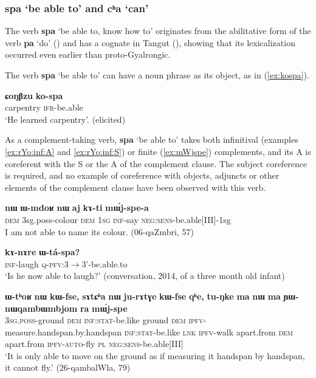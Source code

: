 \documentclass[oneside,a4paper,11pt]{article}
\newcommand{\ipa}[1]{\textbf{\phon#1}} %
\newcommand{\jpg}[2]{\ipa{#1} `#2'} %
\newcommand{\refb}[1]{(\ref{#1})}
\begin{document}
\subsubsection{\jpg{spa}{be able to} and \jpg{cʰa}{can}} \label{sec:spa}
The verb \jpg{spa}{be able to, know how to} originates from the abilitative form of the verb \ipa{pa} `do' (\citealt{jacques15causative}) and has a cognate in Tangut  (\citealt{jacques14esquisse}), showing that its lexicalization occurred even earlier than proto-Gyalrongic.

The verb \jpg{spa}{be able to} can have a noun phrase as its object, as  in \refb{ex:kospa}.

\begin{exe}
\ex \label{ex:kospa}
\gll \ipa{ɕoŋβzu}	\ipa{ko-spa} \\
carpentry \textsc{ifr}-be.able \\
\glt `He learned carpentry'. (elicited)
\end{exe}

As a complement-taking verb, \jpg{spa}{be able to} takes both infinitival (examples \ref{ex:rYo:inf:A} and \ref{ex:rYo:inf:S}) or finite (\ref{ex:mWjspe}) complements, and its A is coreferent with the S or the A of the complement clause. The subject coreference is required, and no example of coreference with objects, adjuncts or other elements of the complement clause have been observed with this verb.

\begin{exe}
\ex  \label{ex:rYo:inf:A}
\gll
\ipa{nɯ} 	\ipa{ɯ-mdoʁ} 	\ipa{nɯ} 	\ipa{aj} 	\ipa{kɤ-ti} 	\ipa{mɯ́j-spe-a} \\
\textsc{dem} 3sg.poss-colour \textsc{dem} \textsc{1sg} \textsc{inf}-say \textsc{neg:sens}-be.able[III]-1sg \\
\glt I am not able to name its colour. (06-qaZmbri, 57)
\end{exe}

\begin{exe}
\ex  \label{ex:rYo:inf:S}
\gll 
 \ipa{kɤ-nɤre} 	\ipa{ɯ-tá-spa?}\\
 \textsc{inf}-laugh \textsc{q-pfv}:3$\rightarrow$3'-be.able.to\\
 \glt `Is he now able to laugh?' (conversation, 2014, of a three month old infant)
\end{exe}


\begin{exe}
\ex \label{ex:mWjspe}
\gll \ipa{ɯ-tʰoʁ}	\ipa{nɯ}	\ipa{kɯ-fse,}	\ipa{sɤtɕʰa}	\ipa{nɯ}	\ipa{ju-rɤtɣe}	\ipa{kɯ-fse}	\ipa{qʰe,}	\ipa{tu-ŋke}	\ipa{ma}	\ipa{nɯ}	\ipa{ma}	\ipa{ɲɯ-nɯqambɯmbjom}	\ipa{ra}	\ipa{mɯ́j-spe} \\
\textsc{3sg.poss}-ground \textsc{dem} \textsc{inf:stat}-be.like ground \textsc{dem}  \textsc{ipfv}-measure.handspan.by.handspan \textsc{inf:stat}-be.like  \textsc{lnk} \textsc{ipfv}-walk apart.from \textsc{dem} apart.from \textsc{ipfv-auto}-fly \textsc{pl} \textsc{neg:sens}-be.able[III] \\
\glt  `It is only able to move on the ground as if measuring it handspan by handspan, it cannot fly.' (26-qambalWla, 79)
\end{exe}
 
\end{document}
